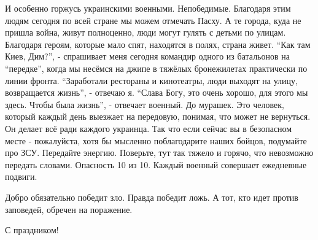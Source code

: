 И особенно горжусь украинскими военными. Непобедимые. Благодаря этим людям
сегодня по всей стране мы можем отмечать Пасху. А те города, куда не пришла
война, живут полноценно, люди могут гулять с детьми по улицам. Благодаря
героям, которые мало спят, находятся в полях, страна живет. \enquote{Как там
Киев, Дим?}, - спрашивает меня сегодня командир одного из батальонов на
\enquote{передке}, когда мы несёмся на джипе в тяжёлых бронежилетах практически
по линии фронта.  \enquote{Заработали рестораны и кинотеатры, люди выходят на
улицу, возвращается жизнь}, - отвечаю я. \enquote{Слава Богу, это очень хорошо,
для этого мы здесь. Чтобы была жизнь}, - отвечает военный. До мурашек. Это
человек, который каждый день выезжает на передовую, понимая, что может не
вернуться. Он делает всё ради каждого украинца. Так что если сейчас вы в
безопасном месте - пожалуйста, хотя бы мысленно поблагодарите наших бойцов,
подумайте про ЗСУ. Передайте энергию.  Поверьте, тут так тяжело и горячо, что
невозможно передать словами. Опасность 10 из 10. Каждый военный совершает
ежедневные подвиги.


Добро обязательно победит зло. Правда победит ложь. А тот, кто идет против
заповедей, обречен на поражение. 

С праздником!
